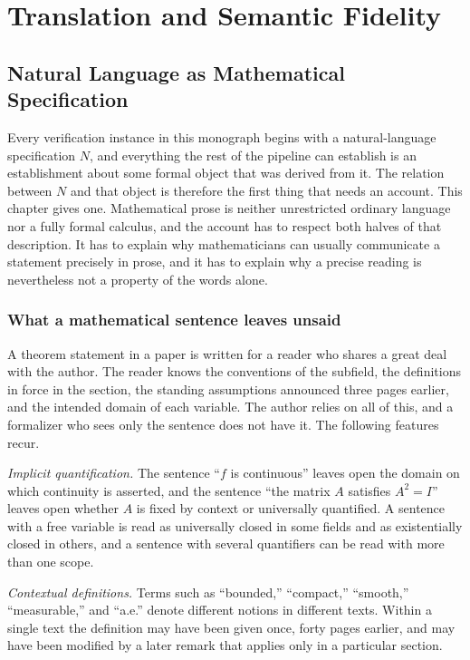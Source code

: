 \part{Translation and Semantic Fidelity}
\chapter{Natural Language as Mathematical Specification}
\label{ch:natural}

Every verification instance in this monograph begins with a natural-language specification $N$, and everything the rest of the pipeline can establish is an establishment about some formal object that was derived from it. The relation between $N$ and that object is therefore the first thing that needs an account. This chapter gives one. Mathematical prose is neither unrestricted ordinary language nor a fully formal calculus, and the account has to respect both halves of that description. It has to explain why mathematicians can usually communicate a statement precisely in prose, and it has to explain why a precise reading is nevertheless not a property of the words alone.

\section{What a mathematical sentence leaves unsaid}

A theorem statement in a paper is written for a reader who shares a great deal with the author. The reader knows the conventions of the subfield, the definitions in force in the section, the standing assumptions announced three pages earlier, and the intended domain of each variable. The author relies on all of this, and a formalizer who sees only the sentence does not have it. The following features recur.

\emph{Implicit quantification.} The sentence ``$f$ is continuous'' leaves open the domain on which continuity is asserted, and the sentence ``the matrix $A$ satisfies $A^2 = I$'' leaves open whether $A$ is fixed by context or universally quantified. A sentence with a free variable is read as universally closed in some fields and as existentially closed in others, and a sentence with several quantifiers can be read with more than one scope.

\emph{Contextual definitions.} Terms such as ``bounded,'' ``compact,'' ``smooth,'' ``measurable,'' and ``a.e.'' denote different notions in different texts. Within a single text the definition may have been given once, forty pages earlier, and may have been modified by a later remark that applies only in a particular section.

